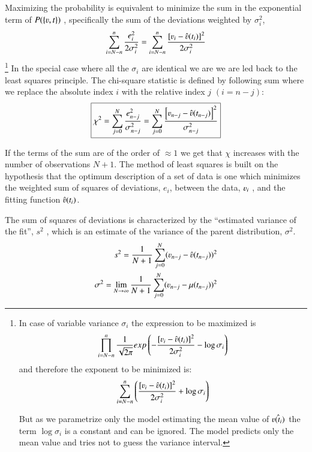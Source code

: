 Maximizing the probability is equivalent to minimize the sum in the exponential term of $ P (\{\varv,t\}) $ , specifically the sum of the deviations weighted by $\sigma^2_i$,
\begin{equation}
\sum\limits_{i=N-n}^n\frac{e_i^2}{2\sigma^2_i}=
\sum\limits_{i=N-n}^n\frac{\left [\varv_i-\hat{\varv}(t_i)\right]^2}{2\sigma^2_i}
\end{equation}
\footnote{ In case of variable variance $\sigma_i$ the expression to be maximized is
\begin{equation}
\prod\limits_{i=N-n}^n\frac{1}{\sqrt{2\pi}} exp\left( -\frac{\left [\varv_i-\hat{\varv}(t_i)\right]^2}{2\sigma^2_i}- \log\sigma_i\right)
\end{equation}
and therefore the exponent to be minimized is:
\begin{equation}
\sum\limits_{i=N-n}^n\left( \frac{\left [\varv_i-\hat{\varv}(t_i)\right]^2}{2\sigma^2_i}+ \log\sigma_i\right)
\end{equation}

But as we parametrize only the model estimating the mean value of $\hat{\varv(t_i)}$ the term $\log\sigma_i$ is a constant and can be ignored. The model predicts only the mean value and tries not to guess the variance interval.}
In the special case where all the $\sigma_i$ are identical we are we are led back to the least squares principle.
The chi-square statistic is defined by following sum where we replace the absolute index $i$ with the relative index $j$  $(i=n-j)$:
\begin{equation}
\boxed{
\chi^2=\sum\limits_{j=0}^{N}\frac{e_{n-j}^2}{\sigma^2_{n-j}}=
\sum\limits_{j=0}^{N}\frac{\left [\varv_{n-j}-\hat{\varv}(t_{n-j})\right]^2}{\sigma^2_{n-j}}
}
\end{equation}

If the terms of the sum are of the order of $\approx 1$ we get that $\chi$ increases with the number of observations $N+1$. The method of least squares is built on the hypothesis that the optimum
description of a set of data is one which minimizes the weighted sum of squares of deviations, $e_i$, between the data, $\varv_i$ , and the fitting function $\hat{\varv}(t_i)$.

The sum of squares of deviations is characterized by the “estimated variance of the fit”, $s^2$ , which is an estimate of the variance of the parent distribution, $\sigma^2$.
\begin{eqnarray}
s^2=\frac{1}{N+1}\sum\limits_{j=0}^{N} (\varv_{n-j}-\hat{\varv}(t_{n-j}))^2\nonumber\\
\sigma^2=\lim\limits_{N\to\infty}\frac{1}{N+1}\sum\limits_{j=0}^{N} (\varv_{n-j}-\mu(t_{n-j}))^2
\end{eqnarray}

